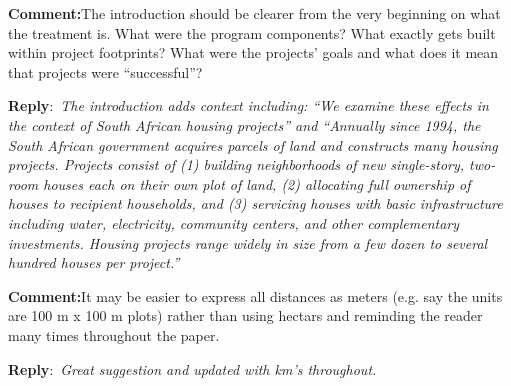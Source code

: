\documentclass{article}
\newcommand{\reply}{\medskip \noindent \textbf{Reply}:\ \textit }
\newcommand{\sr}{\begin{minipage}{\dimexpr\textwidth-3cm}}
\newcommand{\er}{\end{minipage}}
\newcommand{\cc}{\medskip \noindent \textbf{Comment:}\hspace{2em}}
\begin{document}
\cc The introduction should be clearer from the very beginning on what the treatment is. What were the program components? What exactly gets built within project footprints? What were the projects’ goals and what does it mean that projects were “successful”?

\sr
\reply{The introduction adds context including: ``We examine these effects in the context of South African housing projects'' and ``Annually since 1994, the South African government acquires parcels of land and constructs many housing projects.  Projects consist of (1) building neighborhoods of new single-story, two-room houses each on their own plot of land, (2) allocating full ownership of houses to recipient households, and (3) servicing houses with basic infrastructure including water, electricity, community centers, and other complementary investments.  Housing projects range widely in size from a few dozen to several hundred houses per project.''}\\
\er

\cc It may be easier to express all distances as meters (e.g. say the units are 100 m x 100 m plots) rather than using hectars and reminding the reader many times throughout the paper.

\sr
\reply{Great suggestion and updated with km's throughout.}\\
\er
\end{document}

